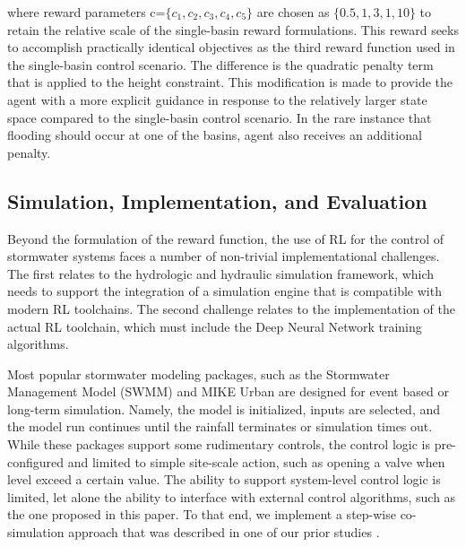 where reward parameters  c=$\{c_1,c_2,c_3,c_4,c_5\}$ are chosen as $\{0.5,1,3,1,10\}$ to retain the relative scale of the single-basin reward formulations.
This reward seeks to accomplish practically identical objectives as the third reward function used in the single-basin control scenario.
The difference is the quadratic penalty term that is applied to the height constraint.
This modification is made to provide the agent with a more explicit guidance in response to the relatively larger state space compared to the single-basin control scenario.
In the rare instance that flooding should occur at one of the basins, agent also receives an additional penalty.

\subsection{\textbf{Simulation, Implementation, and Evaluation}}
Beyond the formulation of the reward function, the use of RL for the control of stormwater systems faces a number of non-trivial implementational challenges.
The first relates to the hydrologic and hydraulic simulation framework, which needs to support the integration of a simulation engine that is compatible with modern RL toolchains.
The second challenge relates to the implementation of the actual RL toolchain, which must include the Deep Neural Network training algorithms.

Most popular stormwater modeling packages, such as the Stormwater Management Model (SWMM) \cite{Rossman2010Storm5.1} and MIKE Urban \cite{Elliott2007ADrainage} are designed for event based or long-term simulation.
Namely, the model is initialized, inputs are selected, and the model run continues until the rainfall terminates or simulation times out.
While these packages support some rudimentary controls, the control logic is pre-configured and limited to simple site-scale action, such as opening a valve when level exceed a certain value.
The ability to support system-level control logic is limited, let alone the ability to interface with external control algorithms, such as the one proposed in this paper.
To that end, we implement a step-wise co-simulation approach that was described in one of our prior studies \cite{Mullapudi2017}.

